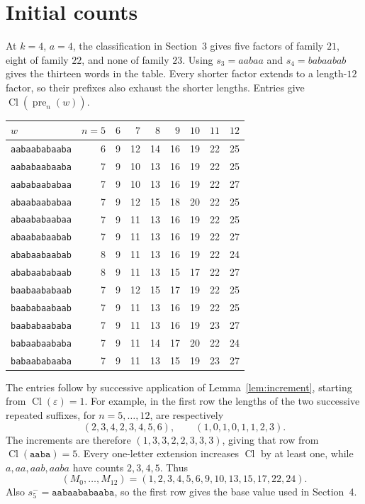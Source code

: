 \documentclass[11pt]{amsart}
\newcommand{\Cl}{\operatorname{Cl}}
\newcommand{\pre}{\operatorname{pre}}
\newcommand{\eps}{\varepsilon}
\begin{document}
\section{Initial counts}\label{app:initial}
At $k=4$, $a=4$, the classification in Section~3 gives five factors of
family $21$, eight of family $22$, and none of family $23$.  Using
$s_3=aabaa$ and $s_4=babaabab$ gives the thirteen words in the table.
Every shorter factor extends to a length-$12$ factor, so their prefixes
also exhaust the shorter lengths.  Entries give $\Cl(\pre_n(w))$.
\begin{center}\small
\begin{tabular}{lrrrrrrrr}
\toprule
$w$&$n=5$&$6$&$7$&$8$&$9$&$10$&$11$&$12$\\\midrule
\texttt{aabaababaaba}&6&9&12&14&16&19&22&25\\
\texttt{aababaabaaba}&7&9&10&13&16&19&22&25\\
\texttt{aababaababaa}&7&9&10&13&16&19&22&27\\
\texttt{abaabaababaa}&7&9&12&15&18&20&22&25\\
\texttt{abaababaabaa}&7&9&11&13&16&19&22&25\\
\texttt{abaababaabab}&7&9&11&13&16&19&22&27\\
\texttt{ababaabaabab}&8&9&11&13&16&19&22&24\\
\texttt{ababaababaab}&8&9&11&13&15&17&22&27\\
\texttt{baabaababaab}&7&9&12&15&17&19&22&25\\
\texttt{baababaabaab}&7&9&11&13&16&19&22&25\\
\texttt{baababaababa}&7&9&11&13&16&19&23&27\\
\texttt{babaabaababa}&7&9&11&14&17&20&22&24\\
\texttt{babaababaaba}&7&9&11&13&15&19&23&27\\\bottomrule
\end{tabular}\end{center}
The entries follow by successive application of
Lemma~\ref{lem:increment}, starting from $\Cl(\eps)=1$.
For example, in the first row the lengths of the two successive repeated
suffixes, for $n=5,\ldots,12$, are respectively
\[
 (2,3,4,2,3,4,5,6),\qquad(1,0,1,0,1,1,2,3).
\]
The increments are therefore $(1,3,3,2,2,3,3,3)$, giving that row from
$\Cl(\texttt{aaba})=5$.
Every one-letter extension increases $\Cl$ by at least one, while
$a,aa,aab,aaba$ have counts $2,3,4,5$.
Thus
\[
 (M_0,\ldots,M_{12})=(1,2,3,4,5,6,9,10,13,15,17,22,24).
\]
Also $s_5^-=\texttt{aabaababaaba}$, so the first row gives the base value
used in Section~4.
\end{document}
